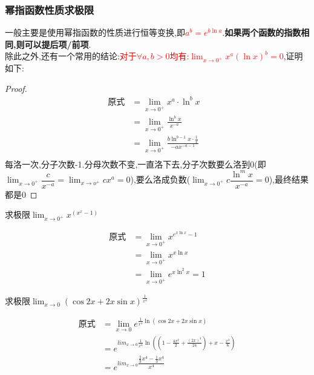 \documentclass[8pt a4paper, oneside, UTF8]{ctexbook}
\begin{document}
\begin{sloppypar}
    \subsubsection{幂指函数性质求极限}
    一般主要是使用幂指函数的性质进行恒等变换,即\textcolor{red}{$a^b=e^{b\ln a}$}.\textbf{如果两个函数的指数相同,则可以提后项/前项}.\\
    除此之外,还有一个常用的结论:\textcolor{red}{对于$\forall a,b>0$均有:$\lim_{x\to 0^+}x^a(\ln x)^b=0$},证明如下:
    \begin{proof}
        \begin{align*}
            \text{原式} & = \lim_{x\to0^{+}}x^{a}\cdot\ln^{b}x & \\
             & = \lim_{x\to0^{+}}\frac{\ln^{b}x}{x^{-a}} &\\
             & =\lim_{x\to0^{+}}\frac{b\ln^{b-1}x\cdot\frac{1}{x}}{-ax^{-a-1}}&\\
        \end{align*}
    每洛一次,分子次数-1.分母次数不变,一直洛下去,分子次数要么洛到0(即$\lim_{x\to 0^+}\dfrac{c}{x^{-a}}=\lim_{x\to o^+} cx^a=0$),要么洛成负数($\lim_{x\to 0^+ }c\dfrac{\ln^m x}{x^{-a}}=0$),最终结果都是0
    \end{proof}
    \begin{problem}
    求极限$\lim_{x\to0^+}x^{(x^x-1)}$
    \end{problem}
    \begin{solution}
        \begin{align*}
          \text{原式} & =\lim_{x\to0^+}x^{e^{x \ln x}-1}\\
          & =\lim_{x\to0^+} x^{x \ln x} \\
          & =\lim_{x\to0^+} e^{x \ln^2 x}=1
        \end{align*}
    \end{solution}
    \begin{problem}
        求极限$\operatorname*{lim}_{x\to0}(\cos2x+2x \sin x)^{\frac{1}{x^{4}}}$
    \end{problem}
    \begin{solution}
            \begin{align*}
              \text{原式} & =\lim_{x\to0}e^{\frac{1}{x^4}\ln(\cos 2x+2x\sin x)}\\
              & = e^{lim_{x\to0}{\frac{1}{x^4} \ln((1-\frac{4x^2}{2}+\frac{(2x)^4}{24})+x-\frac{x^3}{6})}}\\
              & = e^{lim_{x\to0}{\dfrac{\frac{2}{3}x^4-\frac{1}{3}x^4}{x^4}}}\\

\end{align*}
\end{solution}
\end{sloppypar}
\end{document}
